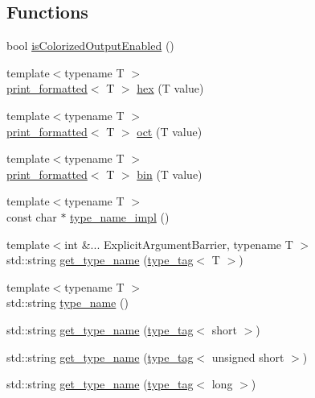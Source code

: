 \subsection*{Functions}
\begin{DoxyCompactItemize}
\item 
bool \hyperlink{namespacedbg_a4dffa8fa9b0dd86306608691d534a050}{is\+Colorized\+Output\+Enabled} ()
\item 
{\footnotesize template$<$typename T $>$ }\\\hyperlink{structdbg_1_1print__formatted}{print\+\_\+formatted}$<$ T $>$ \hyperlink{namespacedbg_afe9f0e1588144f8bb978cdc78d346682}{hex} (T value)
\item 
{\footnotesize template$<$typename T $>$ }\\\hyperlink{structdbg_1_1print__formatted}{print\+\_\+formatted}$<$ T $>$ \hyperlink{namespacedbg_af52f01dbdbb25506c5cfecab4c57d52a}{oct} (T value)
\item 
{\footnotesize template$<$typename T $>$ }\\\hyperlink{structdbg_1_1print__formatted}{print\+\_\+formatted}$<$ T $>$ \hyperlink{namespacedbg_a554c31997738273466a9f1fd426a3369}{bin} (T value)
\item 
{\footnotesize template$<$typename T $>$ }\\const char $\ast$ \hyperlink{namespacedbg_aaf90b7c26aa95f1666f2446996973cac}{type\+\_\+name\+\_\+impl} ()
\item 
{\footnotesize template$<$int \&... Explicit\+Argument\+Barrier, typename T $>$ }\\std\+::string \hyperlink{namespacedbg_a20edc7ca4e92e4b3bddc6b983384aa00}{get\+\_\+type\+\_\+name} (\hyperlink{structdbg_1_1type__tag}{type\+\_\+tag}$<$ T $>$)
\item 
{\footnotesize template$<$typename T $>$ }\\std\+::string \hyperlink{namespacedbg_aab63fa619583229308f148088ffac7a0}{type\+\_\+name} ()
\item 
std\+::string \hyperlink{namespacedbg_a77b693006b8b158eb9a4604fba56a782}{get\+\_\+type\+\_\+name} (\hyperlink{structdbg_1_1type__tag}{type\+\_\+tag}$<$ short $>$)
\item 
std\+::string \hyperlink{namespacedbg_ae70efee8c9a9d398975f71b216602097}{get\+\_\+type\+\_\+name} (\hyperlink{structdbg_1_1type__tag}{type\+\_\+tag}$<$ unsigned short $>$)
\item 
std\+::string \hyperlink{namespacedbg_a380f1bf409dda5e8c67a269b27d14aee}{get\+\_\+type\+\_\+name} (\hyperlink{structdbg_1_1type__tag}{type\+\_\+tag}$<$ long $>$)

\end{DoxyCompactItemize}
